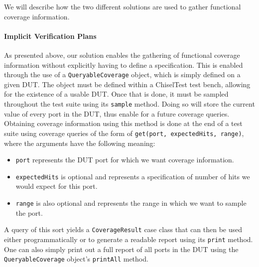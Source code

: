 \documentclass[conference]{IEEEtran}
\begin{document}
We will describe how the two different solutions are used to gather functional coverage information.

\paragraph{Implicit Verification Plans} As presented above, our solution enables the gathering of functional coverage information without explicitly having to define a specification.
This is enabled through the use of a \texttt{QueryableCoverage} object, which is simply defined on a given DUT.
The object must be defined within a ChiselTest test bench, allowing for the existence of a usable DUT.
Once that is done, it must be sampled throughout the test suite using its \texttt{sample} method.
Doing so will store the current value of every port in the DUT, thus enable for a future coverage queries.
Obtaining coverage information using this method is done at the end of a test suite using coverage queries of the form of \texttt{get(port, expectedHits, range)}, where the arguments have the following meaning:
\begin{itemize}
	\item \texttt{port} represents the DUT port for which we want coverage information.
	\item \texttt{expectedHits} is optional and represents a specification of number of hits we would expect for this port.
	\item \texttt{range} is also optional and represents the range in which we want to sample the port.
\end{itemize}
A query of this sort yields a \texttt{CoverageResult} case class that can then be used either programmatically or to generate a readable report using its \texttt{print} method.
One can also simply print out a full report of all ports in the DUT using the \texttt{QueryableCoverage} object's \texttt{printAll} method.
\end{document}
